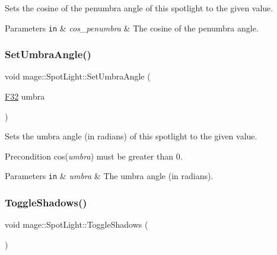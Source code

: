 Sets the cosine of the penumbra angle of this spotlight to the given value.


\begin{DoxyParams}[1]{Parameters}
\mbox{\tt in}  & {\em cos\+\_\+penumbra} & The cosine of the penumbra angle. \\
\hline
\end{DoxyParams}
\hypertarget{classmage_1_1_spot_light_aab2685ef31177d7e40ef964fb9bc0e24}{}\label{classmage_1_1_spot_light_aab2685ef31177d7e40ef964fb9bc0e24} 
\subsubsection{\texorpdfstring{Set\+Umbra\+Angle()}{SetUmbraAngle()}}
{\footnotesize\ttfamily void mage\+::\+Spot\+Light\+::\+Set\+Umbra\+Angle (\begin{DoxyParamCaption}\item[{\hyperlink{namespacemage_aa97e833b45f06d60a0a9c4fc22ae02c0}{F32}}]{umbra }\end{DoxyParamCaption})\hspace{0.3cm}{\ttfamily [noexcept]}}

Sets the umbra angle (in radians) of this spotlight to the given value.

\begin{DoxyPrecond}{Precondition}
cos({\itshape umbra}) must be greater than 0. 
\end{DoxyPrecond}

\begin{DoxyParams}[1]{Parameters}
\mbox{\tt in}  & {\em umbra} & The umbra angle (in radians). \\
\hline
\end{DoxyParams}
\hypertarget{classmage_1_1_spot_light_ae81d5d3c485a85f373d5b7b861919a3c}{}\label{classmage_1_1_spot_light_ae81d5d3c485a85f373d5b7b861919a3c} 
\subsubsection{\texorpdfstring{Toggle\+Shadows()}{ToggleShadows()}}
{\footnotesize\ttfamily void mage\+::\+Spot\+Light\+::\+Toggle\+Shadows (\begin{DoxyParamCaption}{ }\end{DoxyParamCaption})\hspace{0.3cm}{\ttfamily [noexcept]}}

